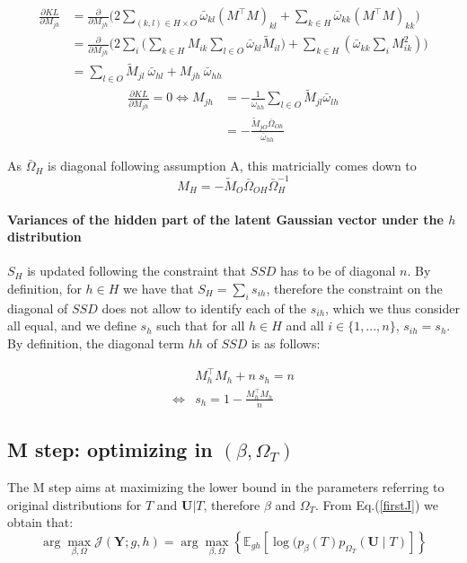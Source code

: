 \documentclass[11pt,a4paper]{article}
\newcommand{\argmax}{\arg\!\max}
\newcommand{\Ybf}{\boldsymbol{Y}}
\newcommand{\Ubf}{\boldsymbol{U}}
\newcommand{\Esp}{\mathds{E}}
\begin{document}
\begin{align*}
\frac{\partial KL}{\partial M_{jh}} &= \frac{\partial}{\partial M_{jh}}\Big(2\sum_{ (k, l) \in H\times O}\bar{\omega}_{kl} (M^\intercal M)_{kl} + \sum_{k\in H} \bar{\omega}_{kk} (M^\intercal M)_{kk}\Big)\\
&=\frac{\partial}{\partial M_{jh}}\Big(2\sum_i \Big(\sum_{k\in H} M_{ik}\sum_{l\in O}\bar{\omega}_{kl} \widetilde{M}_{il}\Big) + \sum_{k\in H} (\bar{\omega}_{kk} \sum_i M_{ik}^2)\Big)\\
&=   \sum_{l \in O } \widetilde{M}_{jl}\: \bar{\omega}_{hl} + M_{jh} \:\bar{\omega}_{hh}
\end{align*}
\begin{align*}
\frac{\partial KL}{\partial M_{jh}}  = 0\iff M_{jh} &= -\frac{1}{\bar{\omega}_{hh}} \sum_{l\in O} \widetilde{M}_{jl}\bar{\omega}_{lh}\\
&=-\frac{\widetilde{M}_{jO} \bar{\Omega}_{Oh}}{\bar{\omega}_{hh}}
\end{align*}

As $\bar{\Omega}_H$ is diagonal following assumption A, this  matricially comes down to
$$\boxed{ M_H = -\widetilde{M}_O\bar{\Omega}_{OH} \bar{\Omega}_H^{-1}}$$


\paragraph{Variances of the hidden part of the latent Gaussian vector under the $h$ distribution \\}
$S_H$ is updated following the constraint that $SSD$ has to be of diagonal $n$. By definition, for $h\in H$ we have that $S_H = \sum_i s_{ih}$, therefore the constraint on the diagonal of $SSD$ does not allow to identify each of the $s_{ih}$, which we thus consider all equal, and we define $s_h$ such that for all $ h\in H$ and all $ i\in \{1,...,n\}$, $s_{ih} = s_h$.  By definition, the diagonal term $hh$ of $SSD$ is as follows:

\begin{align*}
& M_h^\intercal M_h+ n\:s_h = n\\
\iff &\boxed{s_h = 1-\frac{ M_h^\intercal M_h}{n}}
\end{align*}

 \subsection{M step: optimizing in $(\beta, \Omega_T)$}
 The M step aims at maximizing the lower bound in the parameters referring to original distributions for $T$ and $\Ubf|T$, therefore $\beta$ and $\Omega_T$. From Eq.(\ref{firstJ}) we obtain that: 
$$ \argmax_{\beta, \Omega} \mathcal{J}(\Ybf ; g,h) =\argmax_{\beta, \Omega} \left\{ \Esp_{gh} [\log (p_\beta(T)p_{\Omega_T}(\Ubf\mid T) ]\right\} $$
\end{document}
